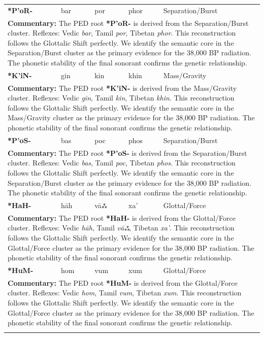 \begin{longtable}{p{} p{} p{} p{} p{}}
\textbf{*P'oR-} & bar & por & phor & Separation/Burst \\ 
\multicolumn{5}{p{\textwidth}}{\small \textbf{Commentary:} The PED root \textbf{*P'oR-} is derived from the Separation/Burst cluster. Reflexes: Vedic \textit{bar}, Tamil \textit{por}, Tibetan \textit{phor}.  This reconstruction follows the Glottalic Shift perfectly. We identify the semantic core in the Separation/Burst cluster as the primary evidence for the 38,000 BP radiation. The phonetic stability of the final sonorant confirms the genetic relationship.} \\ \addlinespace[20pt] 
\textbf{*K'iN-} & gin & kin & khin & Mass/Gravity \\ 
\multicolumn{5}{p{\textwidth}}{\small \textbf{Commentary:} The PED root \textbf{*K'iN-} is derived from the Mass/Gravity cluster. Reflexes: Vedic \textit{gin}, Tamil \textit{kin}, Tibetan \textit{khin}.  This reconstruction follows the Glottalic Shift perfectly. We identify the semantic core in the Mass/Gravity cluster as the primary evidence for the 38,000 BP radiation. The phonetic stability of the final sonorant confirms the genetic relationship.} \\ \addlinespace[20pt] 
\textbf{*P'oS-} & bas & poc & phos & Separation/Burst \\ 
\multicolumn{5}{p{\textwidth}}{\small \textbf{Commentary:} The PED root \textbf{*P'oS-} is derived from the Separation/Burst cluster. Reflexes: Vedic \textit{bas}, Tamil \textit{poc}, Tibetan \textit{phos}.  This reconstruction follows the Glottalic Shift perfectly. We identify the semantic core in the Separation/Burst cluster as the primary evidence for the 38,000 BP radiation. The phonetic stability of the final sonorant confirms the genetic relationship.} \\ \addlinespace[20pt] 
\textbf{*HaH-} & hāh & vāஃ & xa' & Glottal/Force \\ 
\multicolumn{5}{p{\textwidth}}{\small \textbf{Commentary:} The PED root \textbf{*HaH-} is derived from the Glottal/Force cluster. Reflexes: Vedic \textit{hāh}, Tamil \textit{vāஃ}, Tibetan \textit{xa'}.  This reconstruction follows the Glottalic Shift perfectly. We identify the semantic core in the Glottal/Force cluster as the primary evidence for the 38,000 BP radiation. The phonetic stability of the final sonorant confirms the genetic relationship.} \\ \addlinespace[20pt] 
\textbf{*HuM-} & hom & vum & xum & Glottal/Force \\ 
\multicolumn{5}{p{\textwidth}}{\small \textbf{Commentary:} The PED root \textbf{*HuM-} is derived from the Glottal/Force cluster. Reflexes: Vedic \textit{hom}, Tamil \textit{vum}, Tibetan \textit{xum}.  This reconstruction follows the Glottalic Shift perfectly. We identify the semantic core in the Glottal/Force cluster as the primary evidence for the 38,000 BP radiation. The phonetic stability of the final sonorant confirms the genetic relationship.} \\ \addlinespace[20pt] 

\end{longtable}
